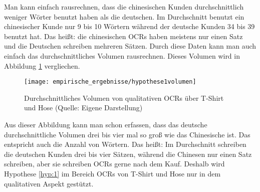Man kann einfach rausrechnen, dass die chinesischen Kunden durchschnittlich weniger Wörter benutzt haben als die deutschen. Im Durchschnitt benutzt ein chinesischer Kunde nur 9 bis 10 Wörtern während der deutsche Kunden 34 bis 39 benutzt hat. Das heißt: die chinesischen \ac{OCRs} haben meistens nur einen Satz und die Deutschen schreiben mehreren Sätzen. Durch diese Daten kann man auch einfach das durchschnittliches Volumen rausrechnen. Dieses Volumen wird in Abbildung \ref{fig:durchschnittlichesVolumen} vergliechen.
\begin{figure}[htb]
\centering
    \texttt{[image: empirische\_ergebnisse/hypothese1volumen]} 
    \caption[Durchschnittliches Volumen von qualitativen OCRs über T-Shirt und Hose]{Durchschnittliches Volumen von qualitativen \ac{OCRs} über T-Shirt und Hose (Quelle: Eigene Darstellung)}
    \label{fig:durchschnittlichesVolumen}
\end{figure}

Aus dieser Abbildung kann man schon erfassen, dass das deutsche durchschnittliche Volumen drei bis vier mal so groß wie das Chinesische ist. Das entspricht auch die Anzahl von Wörtern. Das heißt: Im Durchschnitt schreiben die deutschen Kunden drei bis vier Sätzen, während die Chinesen nur einen Satz schreiben, aber sie schreiben \ac{OCRs} gerne nach dem Kauf. Deshalb wird Hypothese \ref{hyp:1} im Bereich \ac{OCRs} von T-Shirt und Hose nur in dem qualitativen Aspekt gestützt.
